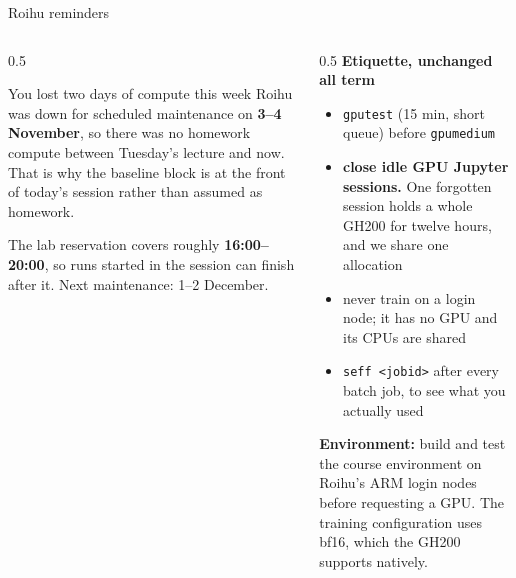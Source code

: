\documentclass[aspectratio=169,10pt]{beamer}
\begin{document}
\begin{frame}[shrink=8]{Roihu reminders}
  \begin{columns}[T]
    \begin{column}{0.5\textwidth}
      \begin{alertblock}{You lost two days of compute this week}
        \small
        Roihu was down for scheduled maintenance on \textbf{3--4 November}, so
        there was no homework compute between Tuesday's lecture and now.
        \vspace{0.3em}
        That is why the baseline block is at the front of today's session rather
        than assumed as homework.
      \end{alertblock}
      \vspace{0.5em}
      \small
      The lab reservation covers roughly \textbf{16:00--20:00}, so runs started
      in the session can finish after it. Next maintenance: 1--2 December.
    \end{column}
    \begin{column}{0.5\textwidth}
      \textbf{Etiquette, unchanged all term}
      \begin{itemize}\small
        \item \texttt{gputest} (15 min, short queue) before \texttt{gpumedium}
        \item \textbf{close idle GPU Jupyter sessions.} One forgotten session
          holds a whole GH200 for twelve hours, and we share one allocation
        \item never train on a login node; it has no GPU and its CPUs are
          shared
        \item \texttt{seff <jobid>} after every batch job, to see what you
          actually used
      \end{itemize}
      \vspace{0.4em}
      \small
      \textbf{Environment:} build and test the course environment on Roihu's
      ARM login nodes before requesting a GPU. The training configuration uses
      bf16, which the GH200 supports natively.
    \end{column}
  \end{columns}
\end{frame}
\end{document}
